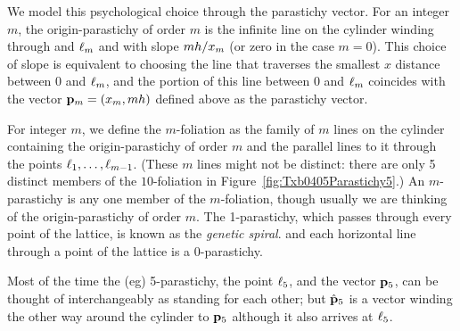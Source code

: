 

We model this psychological choice through the parastichy vector. For an integer $m$, the origin-parastichy of order $m$ is the infinite line on the cylinder winding through  and $\ell_{{m}}$ and  with slope $mh/x_m$ (or zero in the case $m=0$). This choice of slope is equivalent to choosing the line that traverses the smallest $x$ distance between $0$ and $\ell_{{m}}$, and the portion of this line between $0$ and $\ell_{{m}}$ coincides with the vector ${\mathbf p}_{m}=(x_m,mh)$ defined above as the parastichy vector.

For integer $m$, we define the $m$-foliation as  the family of  $m$ lines on the cylinder containing the origin-parastichy of order $m$ and the parallel lines to it through the points $\ell_{{1}},\ldots,\ell_{{m-1}}$. (These $m$ lines might not be distinct: there are only 5 distinct members of the $10$-foliation in Figure~\ref{fig:Txb0405Parastichy5}.)
An $m$-parastichy is any one member of the $m$-foliation, though usually we are thinking of the origin-parastichy of order $m$. 
The 1-parastichy, which passes through every point of the lattice, is known as the \emph{genetic spiral}. 
 and each horizontal line through a point of the lattice is a $0$-parastichy. 

Most of the time the (eg) 5-parastichy, the point $\ell_{{5}}$, and the vector ${\mathbf p}_{5}$,  can be thought of interchangeably as standing for each other; but $\hat{\mathbf p}_{5}$ is a  vector winding the other way around the cylinder to ${\mathbf p}_{5}$ although it also arrives at  $\ell_{{5}}$.
